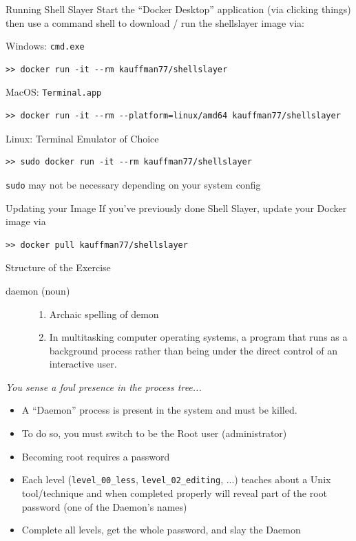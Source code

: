 \documentclass[mathserif]{beamer}
\begin{document}
\begin{frame}[label={sec:org3f6401e},fragile]{Running Shell Slayer}
 Start the ``Docker Desktop'' application (via clicking things) then use
a command shell to download / run the shellslayer image via:

\footnotesize
\begin{block}{Windows: \texttt{cmd.exe}}
\begin{verbatim}
>> docker run -it --rm kauffman77/shellslayer
\end{verbatim}
\end{block}
\begin{block}{MacOS: \texttt{Terminal.app}}
\begin{verbatim}
>> docker run -it --rm --platform=linux/amd64 kauffman77/shellslayer
\end{verbatim}
\end{block}
\begin{block}{Linux: Terminal Emulator of Choice}
\begin{verbatim}
>> sudo docker run -it --rm kauffman77/shellslayer
\end{verbatim}
\texttt{sudo} may not be necessary depending on your system config
\end{block}
\begin{block}{Updating your Image}
If you've previously done Shell Slayer, update your Docker image via
\begin{verbatim}
>> docker pull kauffman77/shellslayer
\end{verbatim}
\end{block}
\end{frame}
\begin{frame}[label={sec:orgbe47cd0},fragile]{Structure of the Exercise}
 \begin{description}
\item[{daemon (noun)}] \begin{enumerate}
\item Archaic spelling of demon
\item In multitasking computer operating systems, a program that runs
as a background process rather than being under the direct
control of an interactive user.
\end{enumerate}
\end{description}

\normalsize
\emph{You sense a foul presence in the process tree...}
\begin{itemize}
\item A ``Daemon'' process is present in the system and must be killed.
\item To do so, you must switch to be the Root user (administrator)
\item Becoming root requires a password
\item Each level (\texttt{level\_00\_less}, \texttt{level\_02\_editing}, ...) teaches about
a Unix tool/technique and when completed properly will reveal part
of the root password (one of the Daemon's names)
\item Complete all levels, get the whole password, and slay the
Daemon
\end{itemize}
\end{frame}
\end{document}
